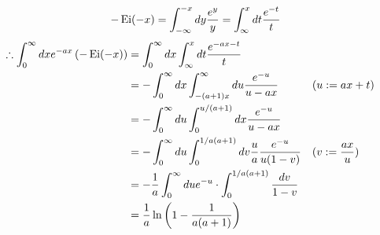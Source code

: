 \item

\[
    -\operatorname{Ei}(-x)
    = \int_{-\infty}^{-x} dy \frac{e^y}{y}
    = \int_\infty^x dt \frac{e^{-t}}{t}
\]
\begin{align*}
    \therefore \int_0^\infty dx e^{-ax} \left( -\operatorname{Ei}(-x) \right)
    &= \int_0^\infty dx \int_{\infty}^x dt \frac{e^{-ax - t}}{t} \\
    &= -\int_0^\infty dx \int_{-(a + 1)x}^\infty du \frac{e^{-u}}{u - ax} && (u := ax + t) \\
    &= -\int_0^\infty du \int_0^{u / (a + 1)} dx \frac{e^{-u}}{u - ax} \\ 
    &= -\int_0^\infty du \int_0^{1/a(a + 1)} dv \frac{u}{a} \frac{e^{-u}}{u(1 - v)} && (v := \frac{ax}{u}) \\
    &= -\frac{1}{a} \int_0^\infty du e^{-u} \cdot \int_0^{1/a(a + 1)} \frac{dv}{1 - v} \\
    &= \frac{1}{a} \ln\left( 1 - \frac{1}{a(a + 1)} \right)
\end{align*}